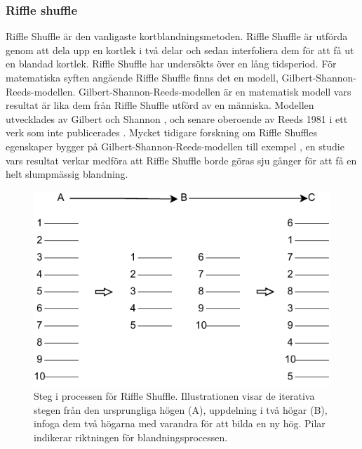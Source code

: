 \documentclass[swedish,a4paper]{article}
\begin{document}
\subsubsection{Riffle shuffle}
\label{sec:riffle_shuffle}
Riffle Shuffle är den vanligaste kortblandningsmetoden. Riffle Shuffle är utförda genom att dela upp en kortlek i två delar och sedan interfoliera dem för att få ut en blandad kortlek.
Riffle Shuffle har undersökts över en lång tidsperiod. För matematiska syften angående Riffle Shuffle finns det en modell, Gilbert-Shannon-Reeds-modellen.  Gilbert-Shannon-Reeds-modellen är en matematisk modell vars resultat är lika dem från Riffle Shuffle utförd av en människa. Modellen utvecklades av Gilbert och Shannon \parencite{gilbertshuftheo}, och senare oberoende av Reeds 1981 i ett verk som inte publicerades \parencite[77-79]{gsr2003mathematical}.  Mycket tidigare forskning om Riffle Shuffles egenskaper bygger på Gilbert-Shannon-Reeds-modellen till exempel \textcite{dovetaillair}, en studie vars resultat verkar medföra att Riffle Shuffle borde göras sju gånger för att få en helt slumpmässig blandning. 

\begin{figure}[H]
	\begin{center}
		\includegraphics{images/rifflle-shuffle.pdf}
	\end{center}
	\captionsetup{justification=centering,margin=2cm}
	\caption{Steg i processen för Riffle Shuffle. Illustrationen visar de
	iterativa stegen från den ursprungliga högen (A), uppdelning i två
	högar (B), infoga dem två högarna med varandra för att bilda en ny hög.
        Pilar indikerar riktningen för blandningsprocessen.}
	\label{fig:riffle_shuffle_1}
\end{figure}
\end{document}
